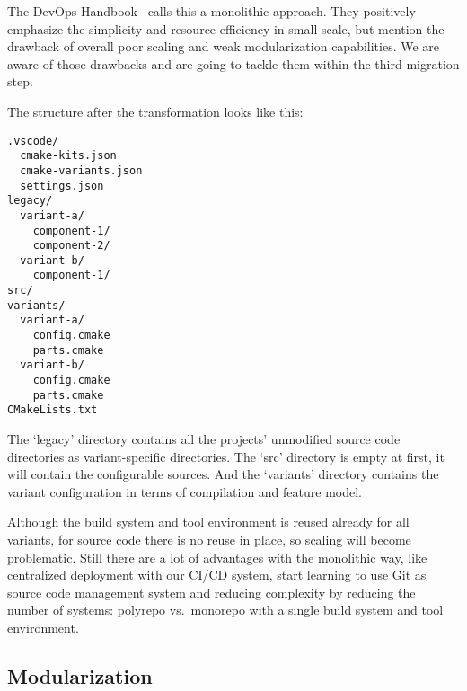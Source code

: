 The DevOps Handbook~\cite{devopshandbook} calls this a monolithic approach. They
positively emphasize the simplicity and resource efficiency in small scale, but
mention the drawback of overall poor scaling and weak modularization
capabilities. We are aware of those drawbacks and are going to tackle them
within the third migration step.

The structure after the transformation looks like this:
\begin{Verbatim}[frame=single,samepage=true]
.vscode/
  cmake-kits.json
  cmake-variants.json
  settings.json
legacy/
  variant-a/
    component-1/
    component-2/
  variant-b/
    component-1/
src/
variants/
  variant-a/
    config.cmake
    parts.cmake
  variant-b/
    config.cmake
    parts.cmake
CMakeLists.txt
\end{Verbatim}

The `legacy' directory contains all the projects' unmodified source code
directories as variant-specific directories. The `src' directory is empty at
first, it will contain the configurable sources. And the `variants' directory
contains the variant configuration in terms of compilation and feature model.

Although the build system and tool environment is reused already for all
variants, for source code there is no reuse in place, so scaling will become
problematic. Still there are a lot of advantages with the monolithic way, like
centralized deployment with our CI/CD system, start learning to use Git as
source code management system and reducing complexity by reducing the number of
systems: polyrepo vs.\ monorepo with a single build system and tool environment.

\subsection{Modularization}\label{modularization}

